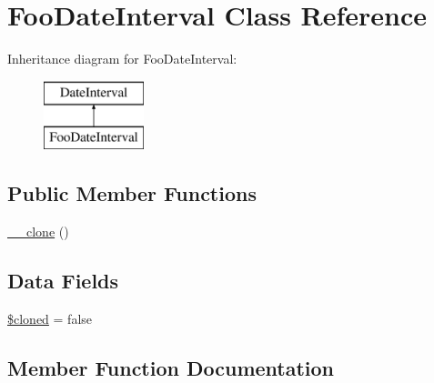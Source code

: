\hypertarget{class_deep_copy_1_1f007_1_1_foo_date_interval}{}\section{Foo\+Date\+Interval Class Reference}
\label{class_deep_copy_1_1f007_1_1_foo_date_interval}
Inheritance diagram for Foo\+Date\+Interval\+:\begin{figure}[H]
\begin{center}
\leavevmode
\includegraphics[height=2.000000cm]{class_deep_copy_1_1f007_1_1_foo_date_interval}
\end{center}
\end{figure}
\subsection*{Public Member Functions}
\begin{DoxyCompactItemize}
\item 
\mbox{\hyperlink{class_deep_copy_1_1f007_1_1_foo_date_interval_ad0cb87b388bc74d63dc884accdca8713}{\+\_\+\+\_\+clone}} ()
\end{DoxyCompactItemize}
\subsection*{Data Fields}
\begin{DoxyCompactItemize}
\item 
\mbox{\hyperlink{class_deep_copy_1_1f007_1_1_foo_date_interval_adde823dfad7d62fbfb51f60b16dcb8d6}{\$cloned}} = false
\end{DoxyCompactItemize}


\subsection{Member Function Documentation}
\mbox{\label{class_deep_copy_1_1f007_1_1_foo_date_interval_ad0cb87b388bc74d63dc884accdca8713}} 
